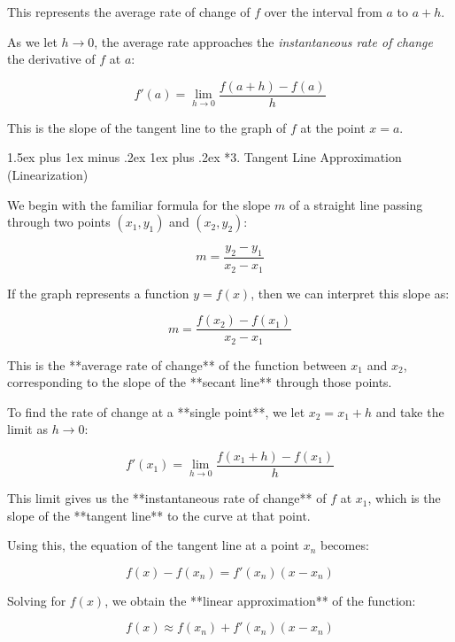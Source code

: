 \documentclass[10pt,twocolumn]{article}
\makeatletter
\renewcommand\section{%
  \@startsection{section}{1}{0pt}%
  {1.5ex plus 1ex minus .2ex}%
  {1ex plus .2ex}%
  {\normalfont\normalsize\bfseries}} %
\makeatother
\begin{document}
This represents the average rate of change of \( f \) over the interval from \( a \) to \( a + h \).

As we let \( h \to 0 \), the average rate approaches the \textit{instantaneous rate of change} \- the derivative of \( f \) at \( a \):

\begin{equation}
f'(a) = \lim_{h \to 0} \frac{f(a + h) - f(a)}{h}
\end{equation}

This is the slope of the tangent line to the graph of \( f \) at the point \( x = a \).

\section*{3. Tangent Line Approximation (Linearization)}

We begin with the familiar formula for the slope \( m \) of a straight line passing through two points \( (x_1, y_1) \) and \( (x_2, y_2) \):

\[
m = \frac{y_2 - y_1}{x_2 - x_1}
\]

If the graph represents a function \( y = f(x) \), then we can interpret this slope as:

\begin{equation}
m = \frac{f(x_2) - f(x_1)}{x_2 - x_1}
\end{equation}

This is the **average rate of change** of the function between \( x_1 \) and \( x_2 \), corresponding to the slope of the **secant line** through those points.

To find the rate of change at a **single point**, we let \( x_2 = x_1 + h \) and take the limit as \( h \to 0 \):

\begin{equation}
f'(x_1) = \lim_{h \to 0} \frac{f(x_1 + h) - f(x_1)}{h}
\end{equation}

This limit gives us the **instantaneous rate of change** of \( f \) at \( x_1 \), which is the slope of the **tangent line** to the curve at that point.

Using this, the equation of the tangent line at a point \( x_n \) becomes:

\[
f(x) - f(x_n) = f'(x_n)(x - x_n)
\]

Solving for \( f(x) \), we obtain the **linear approximation** of the function:

\begin{equation}
f(x) \approx f(x_n) + f'(x_n)(x - x_n)
\end{equation}
\end{document}
